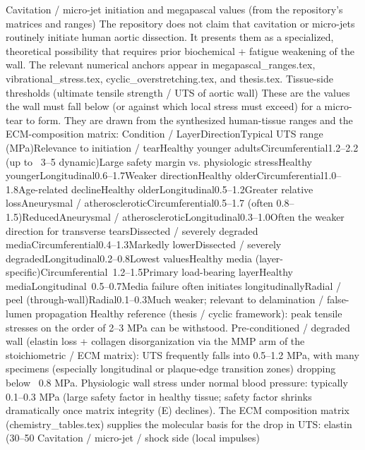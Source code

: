 Cavitation / micro-jet initiation and megapascal values (from the repository’s matrices and ranges)
The repository does not claim that cavitation or micro-jets routinely initiate human aortic dissection. It presents them as a specialized, theoretical possibility that requires prior biochemical + fatigue weakening of the wall. The relevant numerical anchors appear in megapascal_ranges.tex, vibrational_stress.tex, cyclic_overstretching.tex, and thesis.tex.
Tissue-side thresholds (ultimate tensile strength / UTS of aortic wall)
These are the values the wall must fall below (or against which local stress must exceed) for a micro-tear to form. They are drawn from the synthesized human-tissue ranges and the ECM-composition matrix:
Condition / LayerDirectionTypical UTS range (MPa)Relevance to initiation / tearHealthy younger adultsCircumferential1.2–2.2 (up to ~3–5 dynamic)Large safety margin vs. physiologic stressHealthy youngerLongitudinal0.6–1.7Weaker directionHealthy olderCircumferential1.0–1.8Age-related declineHealthy olderLongitudinal0.5–1.2Greater relative lossAneurysmal / atheroscleroticCircumferential0.5–1.7 (often 0.8–1.5)ReducedAneurysmal / atheroscleroticLongitudinal0.3–1.0Often the weaker direction for transverse tearsDissected / severely degraded mediaCircumferential0.4–1.3Markedly lowerDissected / severely degradedLongitudinal0.2–0.8Lowest valuesHealthy media (layer-specific)Circumferential~1.2–1.5Primary load-bearing layerHealthy mediaLongitudinal~0.5–0.7Media failure often initiates longitudinallyRadial / peel (through-wall)Radial0.1–0.3Much weaker; relevant to delamination / false-lumen propagation
Healthy reference (thesis / cyclic framework): peak tensile stresses on the order of 2–3 MPa can be withstood.  
Pre-conditioned / degraded wall (elastin loss + collagen disorganization via the MMP arm of the stoichiometric / ECM matrix): UTS frequently falls into 0.5–1.2 MPa, with many specimens (especially longitudinal or plaque-edge transition zones) dropping below ~0.8 MPa.  
Physiologic wall stress under normal blood pressure: typically 0.1–0.3 MPa (large safety factor in healthy tissue; safety factor shrinks dramatically once matrix integrity (E) declines).
The ECM composition matrix (chemistry_tables.tex) supplies the molecular basis for the drop in UTS: elastin (30–50 %
Cavitation / micro-jet / shock side (local impulses)
